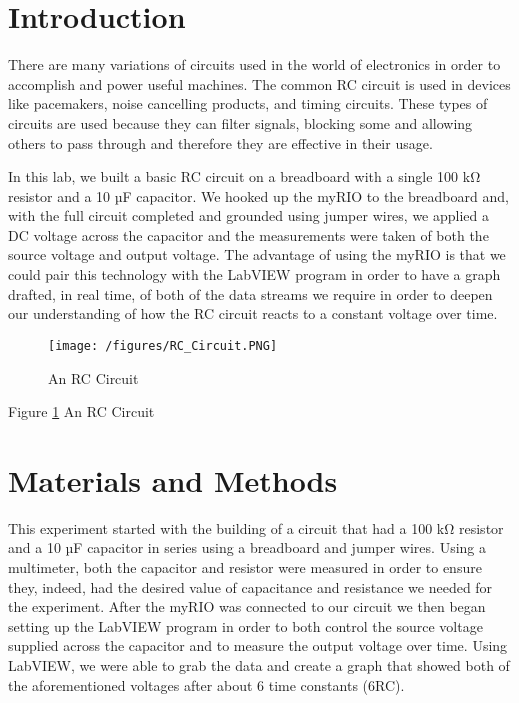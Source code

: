 \documentclass[10pt,twocolumn]{article}
\begin{document}

\section{Introduction} 
\label{sec:introduction}

There are many variations of circuits used in the world of electronics in order to accomplish and power useful machines. The common RC circuit is used in devices like pacemakers, noise cancelling products, and timing circuits. These types of circuits are used because they can filter signals, blocking some and allowing others to pass through and therefore they are effective in their usage. 

In this lab, we built a basic RC circuit on a breadboard with a single 100 kΩ resistor and a 10 µF capacitor. We hooked up the myRIO to the breadboard and, with the full circuit completed and grounded using jumper wires, we applied a DC voltage across the capacitor and the measurements were taken of both the source voltage and output voltage.  The advantage of using the myRIO is that we could pair this technology with the LabVIEW program in order to have a graph drafted, in real time, of both of the data streams we require in order to deepen our understanding of how the RC circuit reacts to a constant voltage over time. 

\begin{figure}
  \texttt{[image: /figures/RC\_Circuit.PNG]}
  \caption{An RC Circuit}
  \label{fig:rc1}
\end{figure}

Figure \ref{fig:rc1} An RC Circuit

\section{Materials and Methods}

This experiment started with the building of a circuit that had a 100 kΩ resistor and a 10 µF capacitor in series using a breadboard and jumper wires. Using a multimeter, both the capacitor and resistor were measured in order to ensure they, indeed, had the desired value of capacitance and resistance we needed for the experiment. After the myRIO was connected to our circuit we then began setting up the LabVIEW program in order to both control the source voltage supplied across the capacitor and to measure the output voltage over time. Using LabVIEW, we were able to grab the data and create a graph that showed both of the aforementioned voltages after about 6 time constants (6RC).
\end{document}
